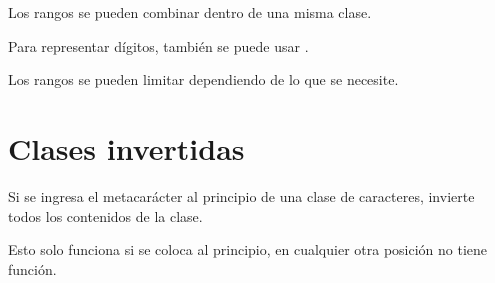 
Los rangos se pueden combinar dentro de una misma clase.


Para representar dígitos, también se puede usar .


Los rangos se pueden limitar dependiendo de lo que se necesite.


\section{Clases invertidas}

Si se ingresa el metacarácter \ttt{^} al principio de una clase de caracteres, invierte todos los contenidos de la clase.


Esto solo funciona si se coloca al principio, en cualquier otra posición no tiene función.


\clearpage